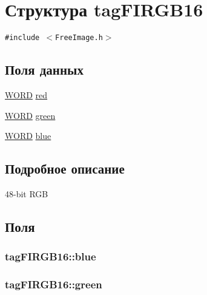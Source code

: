 \hypertarget{structtag_f_i_r_g_b16}{
\section{Структура tagFIRGB16}
\label{structtag_f_i_r_g_b16}
}
{\tt \#include $<$FreeImage.h$>$}

\subsection*{Поля данных}
\begin{CompactItemize}
\item 
\hyperlink{filtration__run_2free_image_2_free_image_8h_b24077addd3b7b13e086987ff296552c}{WORD} \hyperlink{structtag_f_i_r_g_b16_eaa2393246d6482c02cac30d169ee022}{red}
\item 
\hyperlink{filtration__run_2free_image_2_free_image_8h_b24077addd3b7b13e086987ff296552c}{WORD} \hyperlink{structtag_f_i_r_g_b16_00e213246943f0a47698fdd0d51f9924}{green}
\item 
\hyperlink{filtration__run_2free_image_2_free_image_8h_b24077addd3b7b13e086987ff296552c}{WORD} \hyperlink{structtag_f_i_r_g_b16_e9de217a4d3c01c533bc8e727c0ec0eb}{blue}
\end{CompactItemize}


\subsection{Подробное описание}
48-bit RGB 

\subsection{Поля}
\hypertarget{structtag_f_i_r_g_b16_e9de217a4d3c01c533bc8e727c0ec0eb}{
\subsubsection[{blue}]{ {\bf tagFIRGB16::blue}}}
\label{structtag_f_i_r_g_b16_e9de217a4d3c01c533bc8e727c0ec0eb}


\hypertarget{structtag_f_i_r_g_b16_00e213246943f0a47698fdd0d51f9924}{
\subsubsection[{green}]{ {\bf tagFIRGB16::green}}}
\label{structtag_f_i_r_g_b16_00e213246943f0a47698fdd0d51f9924}


